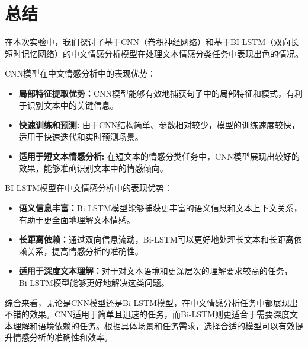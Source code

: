 \section{总结}

在本次实验中，我们探讨了基于CNN（卷积神经网络）和基于BI-LSTM（双向长短时记忆网络）的中文情感分析模型在处理文本情感分类任务中表现出色的情况。

CNN模型在中文情感分析中的表现优势：

\begin{itemize}
    \item \textbf{局部特征提取优势：}CNN模型能够有效地捕获句子中的局部特征和模式，有利于识别文本中的关键信息。
    \item \textbf{快速训练和预测: }由于CNN结构简单、参数相对较少，模型的训练速度较快，适用于快速迭代和实时预测场景。
    \item \textbf{适用于短文本情感分析: }在短文本的情感分类任务中，CNN模型展现出较好的效果，能够准确识别文本中的情感倾向。
\end{itemize}

BI-LSTM模型在中文情感分析中的表现优势：

\begin{itemize}
    \item \textbf{语义信息丰富：}Bi-LSTM模型能够捕获更丰富的语义信息和文本上下文关系，有助于更全面地理解文本情感。
    \item \textbf{长距离依赖：}通过双向信息流动，Bi-LSTM可以更好地处理长文本和长距离依赖关系，提高情感分析的准确性。
    \item \textbf{适用于深度文本理解：}对于对文本语境和更深层次的理解要求较高的任务，Bi-LSTM模型能够更好地解决这类问题。
\end{itemize}

综合来看，无论是CNN模型还是Bi-LSTM模型，在中文情感分析任务中都展现出不错的效果。CNN适用于简单且迅速的任务，而Bi-LSTM则更适合于需要深度文本理解和语境依赖的任务。根据具体场景和任务需求，选择合适的模型可以有效提升情感分析的准确性和效率。